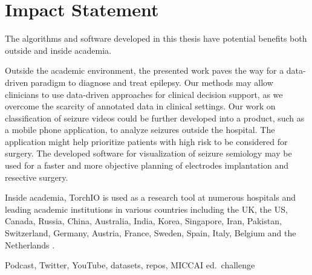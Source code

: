 \chapter{Impact Statement}

The algorithms and software developed in this thesis have potential benefits both outside and inside academia.

Outside the academic environment, the presented work paves the way for a data-driven paradigm to diagnose and treat epilepsy.
Our methods may allow clinicians to use data-driven approaches for clinical decision support, as we overcome the scarcity of annotated data in clinical settings.
Our work on classification of seizure videos could be further developed into a product, such as a mobile phone application, to analyze seizures outside the hospital.
The application might help prioritize patients with high risk to be considered for surgery.
The developed software for visualization of seizure semiology may be used for a faster and more objective planning of electrodes implantation and resective surgery.

Inside academia,
TorchIO is used as a research tool at numerous hospitals and leading academic institutions in various countries including the UK, the US, Canada, Russia, China, Australia, India, Korea, Singapore, Iran, Pakistan, Switzerland, Germany, Austria, France, Sweden, Spain, Italy, Belgium and the Netherlands%
.

Podcast, Twitter, YouTube, datasets, repos, MICCAI ed.\ challenge

